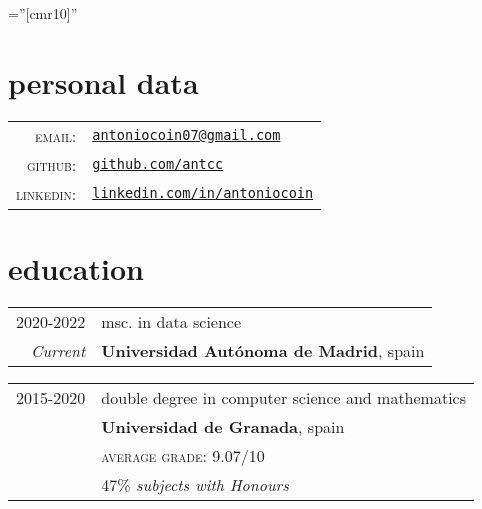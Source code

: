 \documentclass[a4paper,10pt]{article} %
\begin{document}
\pagestyle{empty} %

\font\fb=''[cmr10]'' %


\par{\bigskip\par} %

\section{personal data}

\begin{tabular}{rl}
\textsc{email:} & \href{mailto:antoniocoin07@gmail.com}{\texttt{antoniocoin07@gmail.com}}\\
\textsc{github:} &
\href{https://github.com/antcc}{\texttt{github.com/antcc}}\\
\textsc{linkedin:} &
\href{https://linkedin.com/in/antoniocoin}{\texttt{linkedin.com/in/antoniocoin}}
\end{tabular}


\section{education}

\begin{tabular}{rl}
2020-2022 & msc. in data science\\
\footnotesize{\emph{Current}} & \textbf{Universidad Autónoma de Madrid}, spain\\
\end{tabular}

\begin{tabular}{rl}
2015-2020 & double degree in computer science and mathematics\\
& \textbf{Universidad de Granada}, spain\\
&\normalsize \textsc{average grade}: 9.07/10\\
& 47\% \small\emph{subjects with Honours}\\
\end{tabular}
\end{document}

